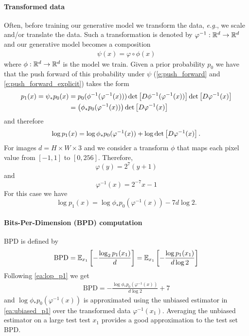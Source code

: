 \documentclass{article}
\makeatletter
\renewcommand*{\eg}{{\it e.g.}\@\xspace}
\makeatother
\begin{document}
\paragraph{Transformed data}
Often, before training our generative model we transform the data, \eg, we scale and/or translate the data. Such a transformation is denoted by $\varphi^{-1}:\mathbb R^d\rightarrow\mathbb R^d$ and our generative model becomes a composition 
\begin{align*}
    \psi(x) = \varphi \circ \phi(x)
\end{align*}
where $\phi:\mathbb R^d \rightarrow \mathbb R^d$ is the model we train. Given a prior probability $p_0$ we have that the push forward of this probability under $\psi$  (\eqref{e:push_forward} and \eqref{e:push_forward_explicit}) takes the form
\begin{align*}
    p_1(x) = \psi_* p_0 (x) &= p_0(\phi^{-1}(\varphi^{-1}(x)))\det\left [D\phi^{-1}(\varphi^{-1}(x))\right ]\det\left [D\varphi^{-1}(x)\right ]\\ 
    &= \left (\phi_* p_0 (\varphi^{-1}(x))\right ) \det\left [D\varphi^{-1}(x)\right ]
\end{align*}
and therefore
\begin{align*}
    \log p_1(x) = \log \phi_* p_0 (\varphi^{-1}(x)) +  \log \det\left [D\varphi^{-1}(x)\right ].
\end{align*}
For images $d=H\times W\times 3$ and we consider a transform $\phi$ that maps each pixel value from $[-1,1]$ to $[0,256]$. Therefore, 
\begin{equation*}
    \varphi(y) = 2^7(y+1)
\end{equation*}
and
\begin{equation*}
    \varphi^{-1}(x) = 2^{-7}x  - 1
\end{equation*}
For this case we have
\begin{equation}\label{ea:lop_p1}
\log p_1(x) = \log \phi_* p_0 (\varphi^{-1}(x)) - 7d\log 2.
\end{equation}

\paragraph{Bits-Per-Dimension (BPD) computation}
BPD is defined by
\begin{equation}
    \mathrm{BPD} = \mathbb{E}_{x_1}\left [ -\frac{\log_2 p_1(x_1)}{d}\right ] = \mathbb{E}_{x_1}\left [ -\frac{\log p_1(x_1)}{d\log 2}\right ]
\end{equation}
Following \eqref{ea:lop_p1} we get
\begin{align*}
    \mathrm{BPD} = -\frac{\log \phi_* p_0 (\varphi^{-1}(x))}{d\log 2 } + 7
\end{align*}
and $\log \phi_* p_0 (\varphi^{-1}(x))$ is approximated using the unbiased estimator in \eqref{ea:ubiased_p1} over the transformed data $\varphi^{-1}(x_1)$. Averaging the unbiased estimator on a large test test $x_1$ provides a good approximation to the test set BPD.
\end{document}
